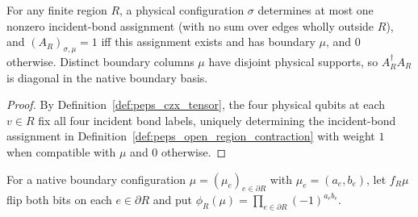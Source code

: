 \begin{lemma}%
    \label{thm:czx_open_region_coefficients}
    \leanok
    For any finite region $R$, a physical configuration $\sigma$ determines at
    most one nonzero incident-bond assignment (with no sum over edges wholly
    outside $R$), and $(A_R)_{\sigma,\mu}=1$ iff this assignment exists and
    has boundary $\mu$, and $0$ otherwise. Distinct boundary columns $\mu$
    have disjoint physical supports, so $A_R^\dagger A_R$ is diagonal in the
    native boundary basis.
\end{lemma}
\begin{proof}\leanok
    By Definition~\ref{def:peps_czx_tensor}, the four physical qubits at each
    $v\in R$ fix all four incident bond labels, uniquely determining the
    incident-bond assignment in Definition~\ref{def:peps_open_region_contraction}
    with weight $1$ when compatible with $\mu$ and $0$ otherwise.
\end{proof}

\begin{definition}%
    \label{def:czx_region_boundary_symmetry}
    \leanok
    For a native boundary configuration $\mu=(\mu_e)_{e\in\partial R}$ with
    $\mu_e=(a_e,b_e)$, let $f_R\mu$ flip both bits on each $e\in\partial R$
    and put $\phi_R(\mu)=\prod_{e\in\partial R}(-1)^{a_eb_e}$.
\end{definition}

